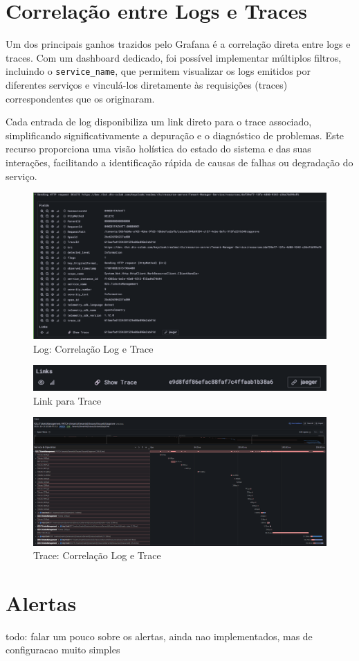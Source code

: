 \section{Correlação entre Logs e Traces}

Um dos principais ganhos trazidos pelo Grafana é a correlação direta entre logs e traces. Com um dashboard dedicado, foi possível implementar múltiplos filtros, incluindo o \texttt{service\_name}, que permitem visualizar os logs emitidos por diferentes serviços e vinculá-los diretamente às requisições (traces) correspondentes que os originaram.

Cada entrada de log disponibiliza um link direto para o trace associado, simplificando significativamente a depuração e o diagnóstico de problemas. Este recurso proporciona uma visão holística do estado do sistema e das suas interações, facilitando a identificação rápida de causas de falhas ou degradação do serviço.

\begin{figure}[H]
    \centering
    \includegraphics[width=1\textwidth]{images/Grafana/log_expanded.png}
    \caption{Log: Correlação Log e Trace}
\end{figure}

\begin{figure}[H]
    \centering
    \includegraphics[width=1\textwidth]{images/Grafana/trace link por log.png}
    \caption{Link para Trace}
\end{figure}

\begin{figure}[h]
    \centering
    \includegraphics[width=1\textwidth]{images/Grafana/trace_approve.png}
    \caption{Trace: Correlação Log e Trace}
\end{figure}

\section{Alertas}

todo: falar um pouco sobre os alertas, ainda nao implementados, mas de configuracao muito simples